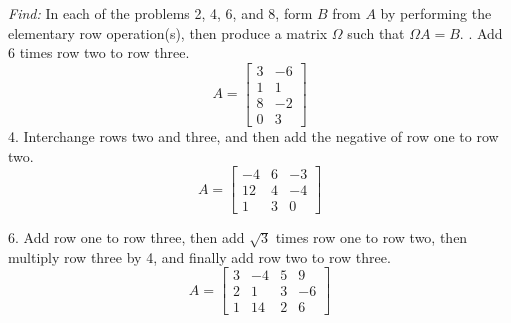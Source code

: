 \documentclass[11pt]{homework}
\begin{document}
\maketitle

\emph{Find:}
\newline
In each of the problems 2, 4, 6, and 8, form $B$ from $A$ by 
performing the elementary row operation(s),
then produce a matrix $\Omega$ such that $\Omega A = B$.
\newline
{}. Add 6 times row two to row three.
\begin{equation*}
A = 
  \begin{bmatrix}
  3 & -6 \\
  1 & 1 \\
  8 & -2 \\
  0 & 3 
  \end{bmatrix}
\end{equation*}
4. Interchange rows two and three, 
and then add the negative of row one to row two.
\begin{equation*}
A = 
  \begin{bmatrix}
  -4 & 6 & -3 \\
  12 & 4 & -4 \\
  1 & 3 & 0 
  \end{bmatrix}
\end{equation*}

6. Add row one to row three,
then add $\sqrt{3}$ times row one to row two,
then multiply row three by 4, 
and finally add row two to row three.
\begin{equation*}
A = 
  \begin{bmatrix}
  3 & -4 & 5 & 9 \\
  2 & 1 & 3 & -6 \\
  1 & 14 & 2 & 6 
  \end{bmatrix}
\end{equation*}
\end{document}
